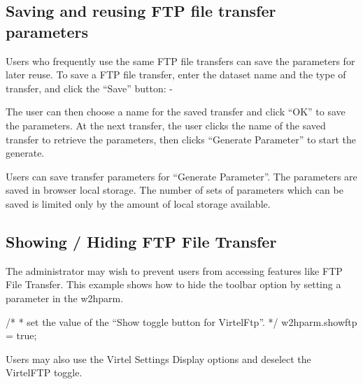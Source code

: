 \documentclass[letterpaper,10pt,english]{sphinxmanual}
\begin{document}
\subsection{Saving and reusing FTP file transfer parameters}
\label{\detokenize{Customization:saving-and-reusing-ftp-file-transfer-parameters}}
Users who frequently use the same FTP file transfers can save the parameters for later reuse. To save a FTP file transfer, enter the dataset name and the type of transfer, and click the “Save” button: -



The user can then choose a name for the saved transfer and click “OK” to save the parameters. At the next transfer, the user clicks the name of the saved transfer to retrieve the parameters, then clicks “Generate Parameter” to start the generate.



Users can save transfer parameters for “Generate Parameter”. The parameters are saved in browser local storage. The number of sets of parameters which can be saved is limited only by the amount of local storage available.


\subsection{Showing / Hiding FTP File Transfer}
\label{\detokenize{Customization:showing-hiding-ftp-file-transfer}}
The administrator may wish to prevent users from accessing features like FTP File Transfer. This example shows how to hide the toolbar option by setting a parameter in the w2hparm.

\begin{sphinxVerbatim}[commandchars=\\\{\}]
/*
* set the value of the “Show toggle button for VirtelFtp”.
*/
w2hparm.showftp = true;
\end{sphinxVerbatim}


Users may also use the Virtel Settings Display options and deselect the VirtelFTP toggle.

\end{document}
